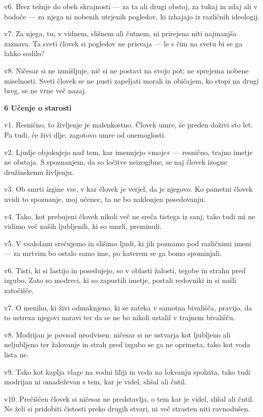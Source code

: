 v6. Brez težnje do obeh skrajnosti --- za ta ali drugi obstoj, za tukaj in zdaj ali v bodoče --- za njega ni nobenih utrjenih pogledov, ki izhajajo iz različnih ideologij.

v7. Za njega, tu, v vidnem, slišnem ali čutnem, ni prirejena niti najmanjša zaznava. Ta sveti človek si pogledov ne prisvaja --- le s čim na svetu bi se ga lahko sodilo?

v8. Ničesar si ne izmišljuje, nič si ne postavi na svojo pot; ne sprejema nobene miselnosti. Sveti človek se ne pusti zapeljati morali in običajem, ko stopi na drugi breg, se ne vrne več nazaj.

\textbf{6 Učenje o starosti}

v1. Resnično, to življenje je malenkostno. Človek umre, še preden doživi sto let. Pa tudi, če živi dlje, zagotovo umre od onemoglosti.

v2. Ljudje objokujejo nad tem, kar imenujejo »moje« --- resnično, trajno imetje ne obstaja. S spoznanjem, da so ločitve neizogibne, se naj človek izogne družinskemu življenju.

v3. Ob smrti izgine vse, v kar človek je verjel, da je njegovo. Ko pametni človek uvidi to spoznanje, moj učenec, ta ne bo naklonjen posedovanju.

v4. Tako, kot prebujeni človek nikoli več ne sreča tistega iz sanj, tako tudi mi ne vidimo več naših ljubljenih, ki so umrli, preminuli.

v5. V vsakdanu srečujemo in slišimo ljudi, ki jih poznamo pod različnimi imeni --- za mrtvim bo ostalo samo ime, po katerem se ga bomo spominjali.

v6. Tisti, ki si lastijo in posedujejo, so v oblasti žalosti, tegobe in strahu pred izgubo. Zato so modreci, ki so zapustili imetje, postali redovniki in si našli zatočišče.

v7. O menihu, ki živi odmaknjeno, ki se zateka v samotna bivališča, pravijo, da to ustreza njegovi naravi ter da se ne bo nikoli ustalil v trajnem bivališču.

v8. Modrijan je povsod neodvisen: ničesar si ne ustvarja kot ljubljeno ali neljubljeno ter žalovanje in strah pred izgubo se ga ne oprimeta, tako kot voda lista ne.

v9. Tako kot kaplja vlage na vodni liliji in voda na lokvanju spolzita, tako tudi modrijan ni omadeževan s tem, kar je videl, slišal ali čutil.

v10. Prečiščen človek si ničesar ne predstavlja, o tem kar je videl, slišal ali čutil. Ne želi si pridobiti čistosti preko drugih stvari, ni več strasten niti ravnodušen.

